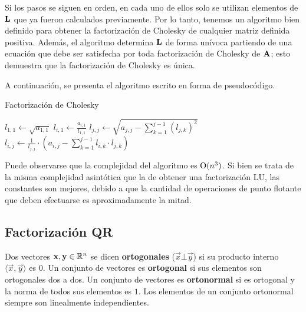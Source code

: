 Si los pasos se siguen en orden, en cada uno de ellos solo se utilizan
elementos de $\mathbf{L}$ que ya fueron calculados previamente. Por lo tanto,
tenemos un algoritmo bien definido para obtener la factorización de Cholesky
de cualquier matriz definida positiva.
Además, el algoritmo determina $\mathbf{L}$ de forma
unívoca partiendo de una ecuación que debe ser satisfecha por toda
factorización de Cholesky de $\mathbf{A}$; esto demuestra que la factorización
de Cholesky es única.

A continuación, se presenta el algoritmo escrito en forma de pseudocódigo.

\begin{algorithm}[H]
\caption{Factorización de Cholesky}
\label{algo:cholesky}


$\displaystyle l_{1,1} \gets \sqrt{a_{1,1}}$\;
 {
    $\displaystyle l_{i,1} \gets \frac{a_{i,1}}{l_{1,1}}$\;
}
 {
    $\displaystyle l_{j,j} \gets \sqrt{a_{j,j} -
        \sum_{k=1}^{j-1} (l_{j,k})^2}$\;
     {
        $\displaystyle l_{i,j} \gets \frac{1}{l_{j,j}} \cdot
        \left( a_{i,j} - \sum_{k=1}^{j-1} l_{i,k} \cdot l_{j,k} \right)$\;
    }
}
\end{algorithm}

Puede observarse que la complejidad del algoritmo es $\mathrm{O}(n^3)$. Si bien
se trata de la misma complejidad asintótica que la de obtener una
factorización LU, las constantes son mejores, debido a que la cantidad de
operaciones de punto flotante que deben efectuarse es aproximadamente la
mitad.


\subsection{Factorización QR}

Dos vectores $\mathbf{x}, \mathbf{y} \in \mathbb{R}^{n}$ se dicen \textbf{ortogonales}
($\vec{x} \bot \vec{y}$) si su producto interno
$\langle \vec{x},\vec{y} \rangle$ es $0$. Un conjunto de vectores
es \textbf{ortogonal} si sus elementos son ortogonales dos a dos. Un conjunto
de vectores es \textbf{ortonormal} si es ortogonal y la norma de todos sus
elementos es $1$. Los elementos de un conjunto ortonormal siempre son
linealmente independientes.

